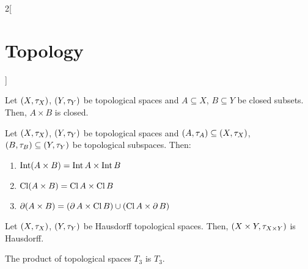 \documentclass[../../../main.tex]{subfiles}
\begin{document}
\begin{multicols}{2}[\section{Topology}]
\begin{prop}
    Let $(X,\tau_X)$, $(Y,\tau_Y)$ be topological spaces and $A\subseteq X$, $B\subseteq Y$ be closed subsets. Then, $A\times B$ is closed.
  \end{prop}
  \begin{prop}
    Let $(X,\tau_X)$, $(Y,\tau_Y)$ be topological spaces and $(A,\tau_A)\subseteq (X,\tau_X)$, $(B,\tau_B)\subseteq (Y,\tau_Y)$ be topological subspaces. Then:
    \begin{enumerate}
      \item $\operatorname{Int}(A\times B)=\operatorname{Int} A\times \operatorname{Int} B$
      \item $\operatorname{Cl}(A\times B)=\operatorname{Cl} A\times \operatorname{Cl} B$
      \item $\operatorname{\partial}(A\times B)=(\operatorname{\partial} A\times\operatorname{Cl} B)\cup(\operatorname{Cl} A\times \operatorname{\partial} B)$
    \end{enumerate}
  \end{prop}
  \begin{prop}
    Let $(X,\tau_X)$, $(Y,\tau_Y)$ be Hausdorff topological spaces. Then, $(X\times Y,\tau_{X\times Y})$ is Hausdorff.
  \end{prop}
  \begin{theorem}
    The product of topological spaces $T_3$ is $T_3$.
  \end{theorem}

\end{multicols}
\end{document}
